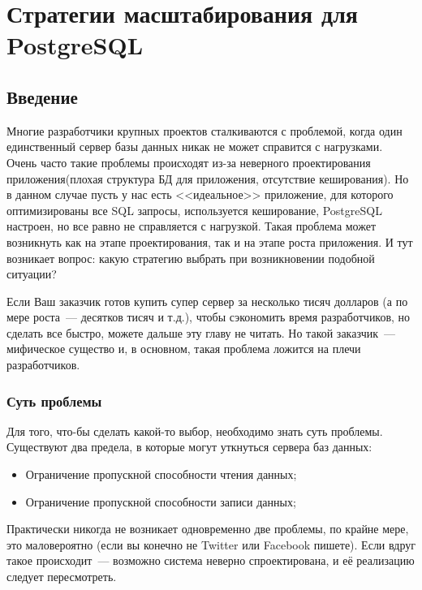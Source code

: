 \chapter{Стратегии масштабирования для PostgreSQL}
\begin{epigraphs}
\end{epigraphs}

\section{Введение}
Многие разработчики крупных проектов сталкиваются с проблемой, когда один единственный сервер 
базы данных никак не может справится с нагрузками. Очень часто такие проблемы происходят из-за 
неверного проектирования приложения(плохая структура БД для приложения, отсутствие кеширования). Но в данном 
случае пусть у нас есть <<идеальное>> приложение, для которого оптимизированы все SQL запросы, используется кеширование, 
PostgreSQL настроен, но все равно не справляется с нагрузкой. Такая проблема может возникнуть как на этапе проектирования, 
так и на этапе роста приложения. И тут возникает вопрос: какую стратегию выбрать при возникновении подобной ситуации?

Если Ваш заказчик готов купить супер сервер за несколько тисяч долларов 
(а по мере роста~--- десятков тисяч и т.д.), чтобы сэкономить время разработчиков, но сделать все быстро, 
можете дальше эту главу не читать. Но такой заказчик~--- мифическое существо и, в основном, такая проблема 
ложится на плечи разработчиков.

\subsection{Суть проблемы}

Для того, что-бы сделать какой-то выбор, необходимо знать суть проблемы. 
Существуют два предела, в которые могут уткнуться сервера баз данных:

\begin{itemize}
\item Ограничение пропускной способности чтения данных;
\item Ограничение пропускной способности записи данных;
\end{itemize}

Практически никогда не возникает одновременно две проблемы, по крайне мере, это маловероятно (если вы конечно не Twitter 
или Facebook пишете). Если вдруг такое происходит~--- возможно система неверно спроектирована, и её реализацию следует пересмотреть.